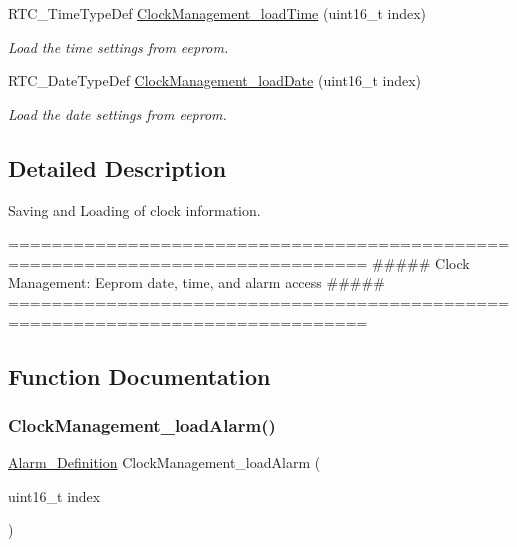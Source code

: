 \begin{DoxyCompactItemize}
R\+T\+C\+\_\+\+Time\+Type\+Def \hyperlink{group___clock___management___eeprom_gab71fe17a64f012980cc619f7d3d55887}{Clock\+Management\+\_\+load\+Time} (uint16\+\_\+t index)
\begin{DoxyCompactList}\small\item\em Load the time settings from eeprom. \end{DoxyCompactList}\item 
R\+T\+C\+\_\+\+Date\+Type\+Def \hyperlink{group___clock___management___eeprom_ga7bc7fe03cb9b82c9d7bc38ece99b7eb1}{Clock\+Management\+\_\+load\+Date} (uint16\+\_\+t index)
\begin{DoxyCompactList}\small\item\em Load the date settings from eeprom. \end{DoxyCompactList}\end{DoxyCompactItemize}


\subsection{Detailed Description}
Saving and Loading of clock information. 

\begin{DoxyVerb}===============================================================================
       ##### Clock Management: Eeprom date, time, and alarm access #####
===============================================================================
\end{DoxyVerb}
 

\subsection{Function Documentation}
\mbox{\label{group___clock___management___eeprom_gab8401f24d519d3a2e54c3ba5dab80376}} 
\subsubsection{\texorpdfstring{Clock\+Management\+\_\+load\+Alarm()}{ClockManagement\_loadAlarm()}}
{\footnotesize\ttfamily \hyperlink{struct_alarm___definition}{Alarm\+\_\+\+Definition} Clock\+Management\+\_\+load\+Alarm (\begin{DoxyParamCaption}\item[{uint16\+\_\+t}]{index }\end{DoxyParamCaption})}



